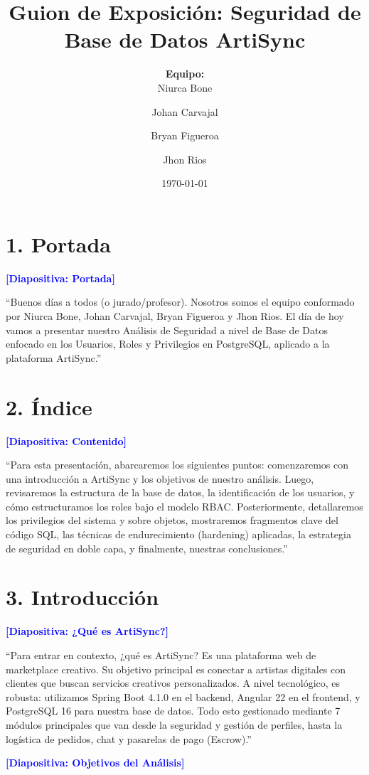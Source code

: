 \documentclass[12pt, a4paper]{article}
\title{\textbf{Guion de Exposición: Seguridad de Base de Datos ArtiSync}}
\author{
    \textbf{Equipo:}\\
    Niurca Bone \and Johan Carvajal \and Bryan Figueroa \and Jhon Rios
}
\date{\today}
\begin{document}
\maketitle

\section*{1. Portada}
\textbf{\textcolor{blue}{[Diapositiva: Portada]}}

``Buenos días a todos (o jurado/profesor). Nosotros somos el equipo conformado por Niurca Bone, Johan Carvajal, Bryan Figueroa y Jhon Rios. El día de hoy vamos a presentar nuestro Análisis de Seguridad a nivel de Base de Datos enfocado en los Usuarios, Roles y Privilegios en PostgreSQL, aplicado a la plataforma ArtiSync.''

\section*{2. Índice}
\textbf{\textcolor{blue}{[Diapositiva: Contenido]}}

``Para esta presentación, abarcaremos los siguientes puntos: comenzaremos con una introducción a ArtiSync y los objetivos de nuestro análisis. Luego, revisaremos la estructura de la base de datos, la identificación de los usuarios, y cómo estructuramos los roles bajo el modelo RBAC. Posteriormente, detallaremos los privilegios del sistema y sobre objetos, mostraremos fragmentos clave del código SQL, las técnicas de endurecimiento (hardening) aplicadas, la estrategia de seguridad en doble capa, y finalmente, nuestras conclusiones.''

\section*{3. Introducción}
\textbf{\textcolor{blue}{[Diapositiva: ¿Qué es ArtiSync?]}}

``Para entrar en contexto, ¿qué es ArtiSync? Es una plataforma web de marketplace creativo. Su objetivo principal es conectar a artistas digitales con clientes que buscan servicios creativos personalizados. 
A nivel tecnológico, es robusta: utilizamos Spring Boot 4.1.0 en el backend, Angular 22 en el frontend, y PostgreSQL 16 para nuestra base de datos. Todo esto gestionado mediante 7 módulos principales que van desde la seguridad y gestión de perfiles, hasta la logística de pedidos, chat y pasarelas de pago (Escrow).''

\vspace{0.5cm}
\textbf{\textcolor{blue}{[Diapositiva: Objetivos del Análisis]}}
\end{document}
